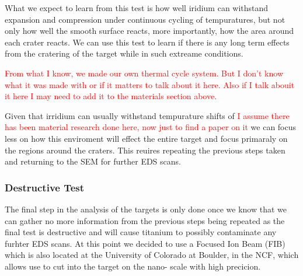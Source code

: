 \documentclass[review]{elsarticle}
\begin{document}
			What we expect to learn from this test is how well iridium can withstand expansion and compression under continuous cycling of tempuratures, but not only how well 
			the smooth surface reacts, more importantly, how the area around each crater reacts. We can use this test to learn if there is any long term effects from the cratering
			of the target while in such extreame conditions. 

			\textcolor{red}{From what I know, we made our own thermal cycle system. But I don't know what it was made with or if it matters to talk about it here. Also if I talk abouit it here
			I may need to add it to the materials section above.} 

			Given that irridium can usually withstand tempurature shifts of \textcolor{red}{I assume there has been material research done here, now just to find a paper on it} we can
			focus less on how this enviroment will effect the entire target and focus primaraly on the regions around the craters. This reuires repeating the previous steps taken and 
			returning to the SEM for further EDS scans. 

			\subsubsection{Destructive Test}
			The final step in the analysis of the targets is only done once we know that we can gather no more information from the previous steps being repeated as the final
			test is destructive and will cause titanium to possibly contaminate any furhter EDS scans. At this point we decided to use a Focused Ion Beam (FIB) which is also located
			at the University of Colorado at Boulder, in the NCF, which allows use to cut into the target on the nano- scale with high precicion. 
\end{document}
